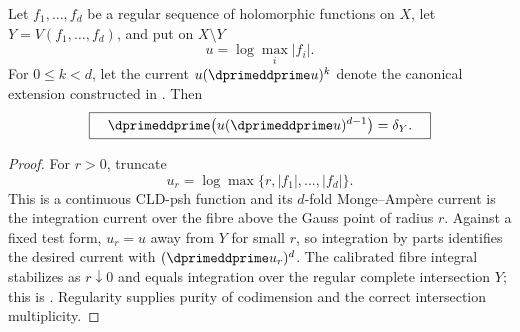 \begin{theorem}\label{thm:cld-local-bochner-martinelli}
Let $f_1,\ldots,f_d$ be a regular sequence of holomorphic functions on $X$,
let $Y=V(f_1,\ldots,f_d)$, and put on $X\setminus Y$
\[
                      u=\log\max_i|f_i|.
\]
For $0\leq k<d$, let the current $u(\dprimeddprime u)^k$ denote the
canonical extension constructed in \cite[\S18.7.1]{CLD25}.  Then
\[
 \boxed{\quad
 \dprimeddprime\!\left(u(\dprimeddprime u)^{d-1}\right)=\delta_Y.
 \quad}
\]
\end{theorem}
\begin{proof}
For $r>0$, truncate
\[
                   u_r=\log\max\{r,|f_1|,\ldots,|f_d|\}.
\]
This is a continuous CLD-psh function and its $d$-fold Monge--Amp\`ere current
is the integration current over the fibre above the Gauss point of radius
$r$.  Against a fixed test form, $u_r=u$ away from $Y$ for small $r$, so
integration by parts identifies the desired current with
$(\dprimeddprime u_r)^d$.  The calibrated fibre integral stabilizes as
$r\downarrow0$ and equals integration over the regular complete intersection
$Y$; this is \cite[Proposition~18.7.3]{CLD25}.  Regularity supplies purity of
codimension and the correct intersection multiplicity.


\end{proof}
